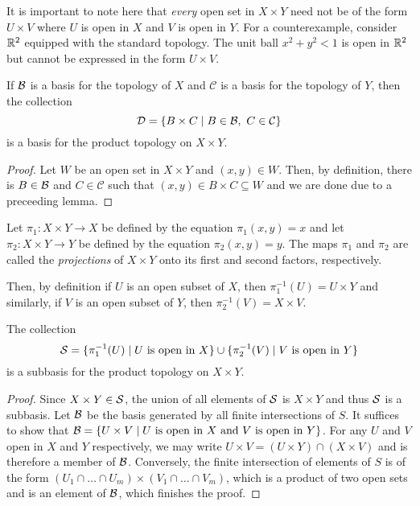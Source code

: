 It is important to note here that \textit{every} open set in $X\times Y$ need not be of the form $U\times V$ where $U$ is open in $X$ and $V$ is open in $Y$. For a counterexample, consider $\R^2$ equipped with the standard topology. The unit ball $x^2 + y^2 < 1$ is open in $\R^2$ but cannot be expressed in the form $U\times V$.

\begin{proposition}
    If $\B$ is a basis for the topology of $X$ and $\mathcal{C}$ is a basis for the topology of $Y$, then the collection 
    \begin{equation*}
        \mathcal{D} = \{B\times C\mid B\in\B,~C\in\mathcal{C}\}
    \end{equation*}
    is a basis for the product topology on $X\times Y$.
\end{proposition}
\begin{proof}
    Let $W$ be an open set in $X\times Y$ and $(x,y)\in W$. Then, by definition, there is $B\in\B$ and $C\in\mathcal{C}$ such that $(x,y)\in B\times C\subseteq W$ and we are done due to a preceeding lemma.
\end{proof}

\begin{definition}
    Let $\pi_1:X\times Y\to X$ be defined by the equation $\pi_1(x,y) = x$ and let $\pi_2:X\times Y\to Y$ be defined by the equation $\pi_2(x,y) = y$. The maps $\pi_1$ and $\pi_2$ are called the \textit{projections} of $X\times Y$ onto its first and second factors, respectively.
\end{definition}

Then, by definition if $U$ is an open subset of $X$, then $\pi_1^{-1}(U) = U\times Y$ and similarly, if $V$ is an open subset of $Y$, then $\pi_2^{-1}(V) = X\times V$.

\begin{proposition}
    The collection 
    \begin{equation*}
        \S = \{\pi_1^{-1}(U)\mid \text{$U$ is open in $X$}\}\cup\{\pi_2^{-1}(V)\mid\text{$V$ is open in $Y$}\}
    \end{equation*}
    is a subbasis for the product topology on $X\times Y$.
\end{proposition}
\begin{proof}
    Since $X\times Y\in\S$, the union of all elements of $\S$ is $X\times Y$ and thus $\S$ is a subbasis. Let $\B$ be the basis generated by all finite intersections of $S$. It suffices to show that $\B = \{U\times V\mid\text{$U$ is open in $X$ and $V$ is open in $Y$}\}$. For any $U$ and $V$ open in $X$ and $Y$ respectively, we may write $U\times V = (U\times Y)\cap(X\times V)$ and is therefore a member of $\B$. Conversely, the finite intersection of elements of $S$ is of the form $(U_1\cap\ldots\cap U_m)\times(V_1\cap\ldots\cap V_m)$, which is a product of two open sets and is an element of $\B$, which finishes the proof.
\end{proof}


